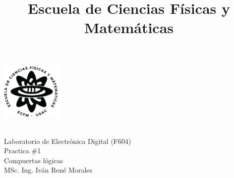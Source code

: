 \documentclass[12pt, letterpaper]{article} %
\title{Escuela de Ciencias Físicas y Matemáticas}
\makeatletter
\let\thetitle\@title
\newcommand{\hoofding}[5]{ %
\begin{flushleft}
\includegraphics[height=2.8cm]{images/logoecfm.png} %
\end{flushleft}
\vspace{-3cm} %
\hspace{4cm} 
\parbox{15cm}{ #1\\#2\\#3\\#4\\#5} %
{\parindent=0pt \hrulefill} 
\vspace{1mm}}
\makeatother
\begin{document}
\setlength{\parindent}{1cm}%

\hoofding {\thetitle}{Laboratorio de Electrónica Digital (F604)}{Practica $\#$1}
{Compuertas lógicas}{MSc. Ing. Iván René Morales}%


%
%
\end{document}
